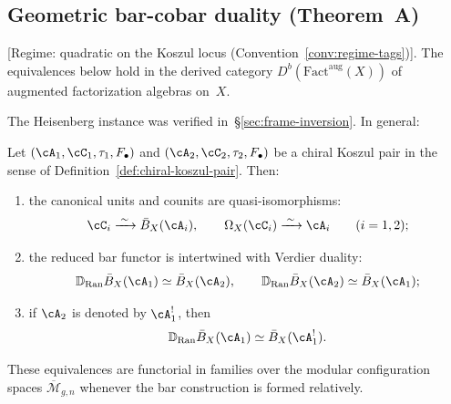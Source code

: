 \subsection{Geometric bar-cobar duality (Theorem~A)}
\label{sec:theorem-a-statement}

\begin{theorem}
\label{thm:bar-cobar-isomorphism-main}
\textup{[}Regime: quadratic on the Koszul locus
\textup{(}Convention~\textup{\ref{conv:regime-tags})].}
The equivalences below hold in the derived category
$D^b(\mathrm{Fact}^{\mathrm{aug}}(X))$ of augmented
factorization algebras on~$X$.

\smallskip\noindent
The Heisenberg instance was verified in~\S\ref{sec:frame-inversion}.
In general:

Let $(\cA_1, \cC_1, \tau_1, F_\bullet)$ and
$(\cA_2, \cC_2, \tau_2, F_\bullet)$ be a chiral Koszul pair in
the sense of Definition~\textup{\ref{def:chiral-koszul-pair}}.
Then:
\begin{enumerate}
\item the canonical units and counits are quasi-isomorphisms:
\[
\cC_i \xrightarrow{\;\sim\;} \bar{B}_X(\cA_i), \qquad
\Omega_X(\cC_i) \xrightarrow{\;\sim\;} \cA_i
\qquad (i = 1, 2);
\]

\item the reduced bar functor is intertwined with Verdier duality:
\[
\mathbb{D}_{\operatorname{Ran}} \bar{B}_X(\cA_1)
\simeq \bar{B}_X(\cA_2), \qquad
\mathbb{D}_{\operatorname{Ran}} \bar{B}_X(\cA_2)
\simeq \bar{B}_X(\cA_1);
\]

\item if $\cA_2$ is denoted by $\cA_1^!$, then
\[
\mathbb{D}_{\operatorname{Ran}} \bar{B}_X(\cA_1)
\simeq \bar{B}_X(\cA_1^!).
\]
\end{enumerate}

These equivalences are functorial in families over the modular
configuration spaces $\overline{\mathcal{M}}_{g,n}$ whenever
the bar construction is formed relatively.
\end{theorem}

